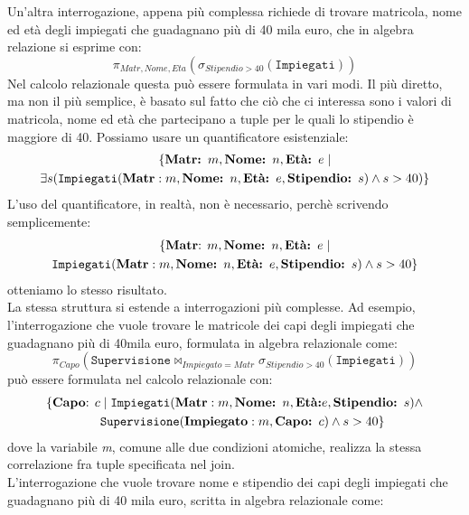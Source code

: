 \documentclass[12pt]{report}
\begin{document}
 	Un'altra interrogazione, appena più complessa richiede di trovare matricola, nome ed età degli impiegati che guadagnano più di 40 mila euro, che in algebra relazione si esprime con:
 	\[
 	\pi_{Matr, Nome, Eta}(\sigma_{Stipendio > 40}(\texttt{Impiegati}))
 	\]
 	Nel calcolo relazionale questa può essere formulata in vari modi. Il più diretto, ma non il più semplice, è basato sul fatto che ciò che ci interessa sono i valori di matricola, nome ed età che partecipano a tuple per le quali lo stipendio è maggiore di 40. Possiamo usare un quantificatore esistenziale:
 	\begin{align*}
 		&\hspace{3.3cm}\{
		\textbf{Matr: }m, \textbf{Nome: }n, \textbf{Età: }e \mid \\
		&\exists s(\texttt{Impiegati}(\textbf{Matr}: m, \textbf{Nome: } n, \textbf{Età: }e, \textbf{Stipendio: }s) \wedge s > 40)
 		\}
 	\end{align*}
 	L'uso del quantificatore, in realtà, non è necessario, perchè scrivendo semplicemente:
 	\begin{align*}
 		& \hspace{3cm}\{\text{\textbf{Matr}: }m, \textbf{Nome: } n, \textbf{Età: } e \mid  \\
 		&\texttt{Impiegati}(\textbf{Matr}: m, \textbf{Nome: } n, \textbf{Età: }e, \textbf{Stipendio: }s) \wedge s > 40\}
 	\end{align*}
 	otteniamo lo stesso risultato. \\
 	La stessa struttura si estende a interrogazioni più complesse. Ad esempio, l'interrogazione che vuole trovare le matricole dei capi degli impiegati che guadagnano più di 40mila euro, formulata in algebra relazionale come:
 	\[
 	\pi_{Capo}(\texttt{Supervisione} \bowtie_{Impiegato = Matr} \sigma_{Stipendio > 40}(\texttt{Impiegati}))
 	\]
 	può essere formulata nel calcolo relazionale con:
 	\begin{align*}
 		\{\text{\textbf{Capo}: }c &\mid \texttt{Impiegati}(\textbf{Matr}: m, \textbf{Nome: }n, \textbf{Età:} e, \textbf{Stipendio: }s) \wedge \\
 		&\texttt{Supervisione}(\textbf{Impiegato}: m, \textbf{Capo: } c) \wedge s > 40\}
 	\end{align*}
 	dove la variabile \textit{m}, comune alle due condizioni atomiche, realizza la stessa correlazione fra tuple specificata nel join. \\
 	L'interrogazione che vuole trovare nome e stipendio dei capi degli impiegati che guadagnano più di 40 mila euro, scritta in algebra relazionale come:
\end{document}
